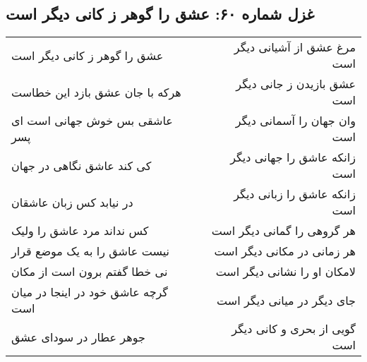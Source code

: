 \begin{center}
\section*{غزل شماره ۶۰: عشق را گوهر ز کانی دیگر است}
\label{sec:060}
\begin{longtable}{l p{0.5cm} r}
عشق را گوهر ز کانی دیگر است
&&
مرغ عشق از آشیانی دیگر است
\\
هرکه با جان عشق بازد این خطاست
&&
عشق بازیدن ز جانی دیگر است
\\
عاشقی بس خوش جهانی است ای پسر
&&
وان جهان را آسمانی دیگر است
\\
کی کند عاشق نگاهی در جهان
&&
زانکه عاشق را جهانی دیگر است
\\
در نیابد کس زبان عاشقان
&&
زانکه عاشق را زبانی دیگر است
\\
کس نداند مرد عاشق را ولیک
&&
هر گروهی را گمانی دیگر است
\\
نیست عاشق را به یک موضع قرار
&&
هر زمانی در مکانی دیگر است
\\
نی خطا گفتم برون است از مکان
&&
لامکان او را نشانی دیگر است
\\
گرچه عاشق خود در اینجا در میان است
&&
جای دیگر در میانی دیگر است
\\
جوهر عطار در سودای عشق
&&
گویی از بحری و کانی دیگر است
\\
\end{longtable}
\end{center}
